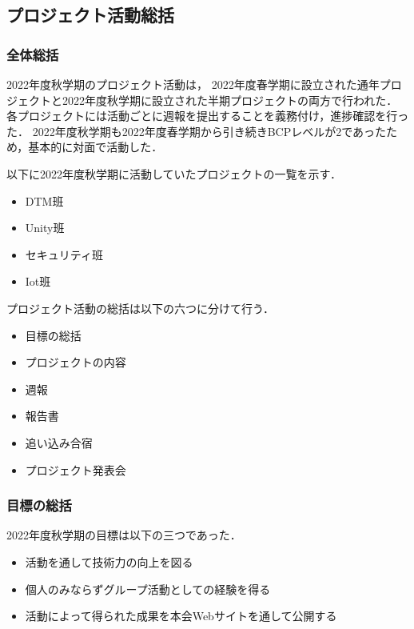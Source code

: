 \subsection*{プロジェクト活動総括}


\subsubsection*{全体総括}
2022年度秋学期のプロジェクト活動は，
2022年度春学期に設立された通年プロジェクトと2022年度秋学期に設立された半期プロジェクトの両方で行われた．
各プロジェクトには活動ごとに週報を提出することを義務付け，進捗確認を行った．
2022年度秋学期も2022年度春学期から引き続きBCPレベルが2であったため，基本的に対面で活動した．


以下に2022年度秋学期に活動していたプロジェクトの一覧を示す．

\begin{itemize}
  \item DTM班
  \item Unity班
  \item セキュリティ班
  \item Iot班

\end{itemize}

プロジェクト活動の総括は以下の六つに分けて行う．

\begin{itemize}
  \item 目標の総括
  \item プロジェクトの内容
  \item 週報
  \item 報告書
  \item 追い込み合宿
  \item プロジェクト発表会
\end{itemize}

\subsubsection*{目標の総括}
2022年度秋学期の目標は以下の三つであった．

\begin{itemize}
  \item 活動を通して技術力の向上を図る
  \item 個人のみならずグループ活動としての経験を得る
  \item 活動によって得られた成果を本会Webサイトを通して公開する
\end{itemize}

